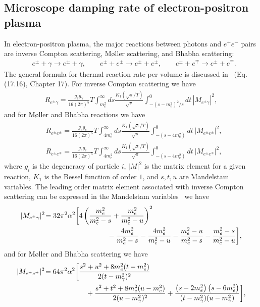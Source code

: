 \subsection{Microscope damping rate of electron-positron plasma}\label{relax}
In electron-positron plasma, the major reactions between photons and $e^+e^-$ pairs are inverse Compton scattering, M{\o}ller scattering, and Bhabha scattering:
\begin{align}
&e^\pm+\gamma\longrightarrow e^\pm+\gamma,\qquad e^\pm+e^\pm\longrightarrow e^\pm+e^\pm,\qquad e^\pm+e^\mp\longrightarrow e^\pm+e^\mp.
\end{align}
The general formula for thermal reaction rate per volume is discussed in~\cite{Letessier:2002ony} (Eq.(17.16), Chapter 17). For inverse Compton scattering we have
\begin{align}
R_{e^{\pm}\gamma}=\frac{g_eg_\gamma}{16\left(2\pi\right)^5}T\int_{m_e^2}^\infty\!\!\!\!ds\frac{K_1(\sqrt{s}/T)}{\sqrt{s}}\int^0_{-(s-m_e^2)^2/s}\!\!\!\!\!\!\!\!\!\!\!\!\!\!\!\!dt\, |M_{e^{\pm}\gamma}|^2,
\end{align} 
and for M{\o}ller and Bhabha reactions we have
\begin{align}
&R_{e^\pm e^\pm}=\frac{g_eg_e}{16\left(2\pi\right)^5}T\!\!\int_{4m_e^2}^\infty\!\!\!\!ds\frac{K_1(\sqrt{s}/T)}{\sqrt{s}}\int^0_{-(s-4m_e^2)}\!\!\!\!\!\!\!\!\!\!\!\!\!\!\!\!dt\,|M_{e^\pm e^\pm}|^2,\\
&R_{e^\pm e^\mp}=\frac{g_eg_e}{16\left(2\pi\right)^5}T\!\!\int_{4m_e^2}^\infty\!\!\!\!ds\frac{K_1(\sqrt{s}/T)}{\sqrt{s}}\int^0_{-(s-4m_e^2)}\!\!\!\!\!\!\!\!\!\!\!\!\!\!\!\!dt\,|M_{e^\pm e^\mp}|^2,
\end{align}
where $g_i$ is the degeneracy of particle $i$, $|M|^2$ is the matrix element for a given reaction, $K_1$ is the Bessel function of order $1$, and $s,t,u$ are Mandelstam variables. The leading order matrix element associated with inverse Compton scattering can be expressed in the Mandelstam variables~\cite{Kuznetsova:2011wt,Kuznetsova:2009bq} we have
\begin{align}
|M_{e^\pm\gamma}|^2\!=32 \pi^2\alpha^2\bigg[&4\left(\frac{m_e^2}{m_e^2-s}+\frac{m_e^2}{m_e^2-u}\right)^2\notag\\
&\qquad\qquad-\frac{4m_e^2}{m_e^2-s}-\frac{4m_e^2}{m_e^2-u} -
 \frac{m_e^2-u}{m_e^2-s} -\frac{m_e^2-s}{m_e^2-u}\bigg],
\end{align}
and for M{\o}ller and Bhabha scattering we have 
\begin{align}
|M_{e^{\pm}e^{\pm}}|^{2}\!=64\pi^{2}\alpha^{2}\bigg[&
\frac{s^{2}+u^{2}+8m_e^{2}(t-m_e^{2})}{2(t-m^2_{\gamma})^{2}}\notag\\
&\quad+\frac{{s^{2}+t^{2}}+8m_e^{2}
(u-m_e^{2})}{2(u-m_{\gamma}^2)^{2}} + \frac{\left( {s}-2m_e^{2}\right)\left({s}-6m_e^{2}\right)}
{(t-m_{\gamma}^2)(u-m_{\gamma}^2)} \bigg],
\end{align}
